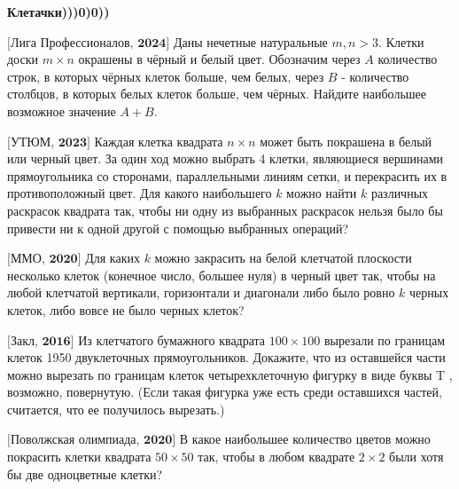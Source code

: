 \centerline{\bf \Huge Клетачки)))0)0))}

\begin{flushright}
        \scriptsize{}
\end{flushright}

$\bigl[\textbf{Лига Профессионалов, 2024}\bigr]$ 
Даны нечетные натуральные $m, n>3$. Клетки доски $m \times n$ окрашены в чёрный и белый цвет. Обозначим через $A$ количество строк, в которых чёрных клеток больше, чем белых, через $B$ - количество столбцов, в которых белых клеток больше, чем чёрных. Найдите наибольшее возможное значение $A+B$.

$\bigl[\textbf{УТЮМ, 2023}\bigr]$
Каждая клетка квадрата $n \times n$ может быть покрашена в белый или черный цвет. За один ход можно выбрать 4 клетки, являющиеся вершинами прямоугольника со сторонами, параллельными линиям сетки, и перекрасить их в противоположный цвет. Для какого наибольшего $k$ можно найти $k$ различных раскрасок квадрата так, чтобы ни одну из выбранных раскрасок нельзя было бы привести ни к одной другой с помощью выбранных операций?

$\bigl[\textbf{ММО, 2020}\bigr]$
Для каких $k$ можно закрасить на белой клетчатой плоскости несколько клеток (конечное число, большее нуля) в черный цвет так, чтобы на любой клетчатой вертикали, горизонтали и диагонали либо было ровно $k$ черных клеток, либо вовсе не было черных клеток?

$\bigl[\textbf{Закл, 2016}\bigr]$
Из клетчатого бумажного квадрата $100 \times 100$ вырезали по границам клеток 1950 двуклеточных прямоугольников. Докажите, что из оставшейся части можно вырезать по границам клеток четырехклеточную фигурку в виде буквы T , возможно, повернутую. (Если такая фигурка уже есть среди оставшихся частей, считается, что ее получилось вырезать.)

$\bigl[\textbf{Поволжская олимпиада, 2020}\bigr]$ 
В какое наибольшее количество цветов можно покрасить клетки квадрата $50 \times 50$ так, чтобы в любом квадрате $2 \times 2$ были хотя бы две одноцветные клетки?


\newpage

\hspace{3mm}